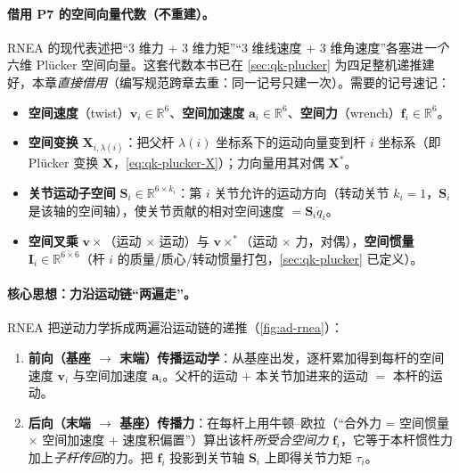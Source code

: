 \paragraph{借用 P7 的空间向量代数（不重建）。}
RNEA 的现代表述把“$3$ 维力 + $3$ 维力矩”“$3$ 维线速度 + $3$ 维角速度”各塞进\emph{一个}六维 Plücker 空间向量。这套代数本书已在 \cref{sec:qk-plucker} 为四足整机递推建好，本章\emph{直接借用}（编写规范跨章去重：同一记号只建一次）。需要的记号速记：
\begin{itemize}
  \item \textbf{空间速度}（twist）$\mathbf{v}_i\in\mathbb{R}^6$、\textbf{空间加速度} $\mathbf{a}_i\in\mathbb{R}^6$、\textbf{空间力}（wrench）$\mathbf{f}_i\in\mathbb{R}^6$。
  \item \textbf{空间变换} $\mathbf{X}_{i,\lambda(i)}$：把父杆 $\lambda(i)$ 坐标系下的运动向量变到杆 $i$ 坐标系（即 Plücker 变换 $\mathbf{X}$，\cref{eq:qk-plucker-X}）；力向量用其对偶 $\mathbf{X}^*$。
  \item \textbf{关节运动子空间} $\mathbf{S}_i\in\mathbb{R}^{6\times k_i}$：第 $i$ 关节允许的运动方向（转动关节 $k_i=1$，$\mathbf{S}_i$ 是该轴的空间轴），使关节贡献的相对空间速度 $=\mathbf{S}_i\dot{q}_i$。
  \item \textbf{空间叉乘} $\mathbf{v}\times$（运动 $\times$ 运动）与 $\mathbf{v}\times^*$（运动 $\times$ 力，对偶），\textbf{空间惯量} $\mathbf{I}_i\in\mathbb{R}^{6\times6}$（杆 $i$ 的质量/质心/转动惯量打包，\cref{sec:qk-plucker} 已定义）。
\end{itemize}

\paragraph{核心思想：力沿运动链“两遍走”。}
RNEA 把逆动力学拆成两遍沿运动链的递推（\cref{fig:ad-rnea}）：
\begin{enumerate}
  \item \textbf{前向（基座 $\to$ 末端）传播运动学}：从基座出发，逐杆累加得到每杆的空间速度 $\mathbf{v}_i$ 与空间加速度 $\mathbf{a}_i$。父杆的运动 $+$ 本关节加进来的运动 $=$ 本杆的运动。
  \item \textbf{后向（末端 $\to$ 基座）传播力}：在每杆上用牛顿--欧拉（“合外力 = 空间惯量 $\times$ 空间加速度 $+$ 速度积偏置”）算出该杆\emph{所受合空间力} $\mathbf{f}_i$，它等于本杆惯性力加上\emph{子杆传回}的力。把 $\mathbf{f}_i$ 投影到关节轴 $\mathbf{S}_i$ 上即得关节力矩 $\tau_i$。
\end{enumerate}

